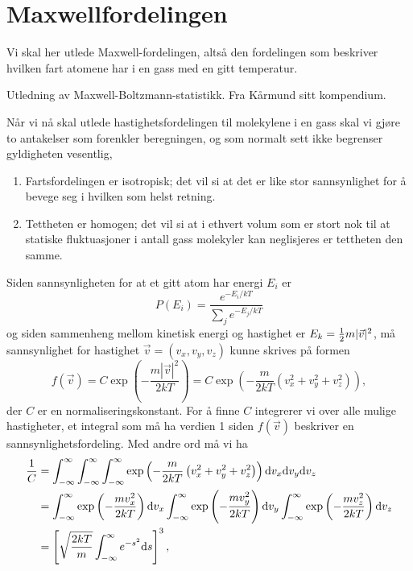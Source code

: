 \section{Maxwellfordelingen}
\label{apx:maxwellfordeling}
Vi skal her utlede Maxwell-fordelingen, altså den fordelingen som beskriver hvilken fart atomene har i en gass med en gitt temperatur. 

Utledning av Maxwell-Boltzmann-statistikk. Fra Kårmund sitt kompendium.

Når vi nå skal utlede hastighetsfordelingen til molekylene i en gass skal vi gjøre to antakelser som forenkler beregningen, og som normalt sett ikke begrenser gyldigheten vesentlig,
\begin{enumerate}
	\item
	Fartsfordelingen er isotropisk; det vil si at det er like stor sannsynlighet for å bevege seg i hvilken som helst retning.
	\item
 	Tettheten er homogen; det vil si at i ethvert volum som er stort nok til at statiske fluktuasjoner i antall gass molekyler kan neglisjeres er tettheten den samme.
\end{enumerate}
Siden sannsynligheten for at et gitt atom har energi $E_i$ er 
\begin{displaymath}
	P(E_i) = \frac{e^{-E_i/kT}}{\sum_j e^{-E_j/kT}}
\end{displaymath}
og siden sammenheng mellom kinetisk energi og hastighet er $E_k = \frac{1}{2} m|\vec{v}|^2$, må sannsynlighet for hastighet $\vec{v} = (v_x,v_y,v_z)$ kunne skrives på formen
\begin{displaymath}
	f(\vec{v}) = C\exp\left(-\frac{m|\vec{v}|^2}{2kT}\right) = C\exp\left(-\frac{m}{2kT}\left(v_x^2+v_y^2+v_z^2\right)\right),
\end{displaymath}
der $C$ er en normaliseringskonstant. For å finne $C$ integrerer vi over alle mulige hastigheter, et integral som må ha verdien 1 siden $f(\vec{v})$ beskriver en sannsynlighetsfordeling. Med andre ord må vi ha
\begin{displaymath}
\begin{aligned}
	\frac{1}{C} &= \int_{-\infty}^{\infty}\int_{-\infty}^{\infty}\int_{-\infty}^{\infty}\exp\left(-\frac{m}{2kT}\left(v_x^2+v_y^2+v_z^2\right)\right)\text{d} v_x \text{d} v_y \text{d} v_z \\
	&= \int_{-\infty}^{\infty}\exp\left(-\frac{mv_x^2}{2kT}\right)\text{d} v_x  \int_{-\infty}^{\infty}\exp\left(-\frac{mv_y^2}{2kT}\right)\text{d} v_y  \int_{-\infty}^{\infty}\exp\left(-\frac{mv_z^2}{2kT}\right)\text{d} v_z \\
	&= \left[ \sqrt{\frac{2kT}{m}}\int_{-\infty}^\infty e^{-s^2} \text{d} s\right]^3, 
\end{aligned}
\end{displaymath}
